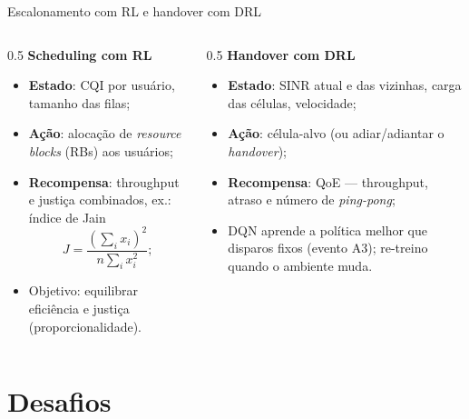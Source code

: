 \documentclass[aspectratio=169,11pt]{beamer}
\begin{document}
\begin{frame}{Escalonamento com RL e handover com DRL}
  \begin{columns}
    \begin{column}{0.5\textwidth}
      \textbf{Scheduling com RL}
      \begin{itemize}
        \item \textbf{Estado}: CQI por usuário, tamanho das filas;
        \item \textbf{Ação}: alocação de \emph{resource blocks} (RBs) aos usuários;
        \item \textbf{Recompensa}: throughput e justiça combinados, ex.: índice de Jain
          $$J = \frac{(\sum_i x_i)^2}{n\sum_i x_i^2};$$
        \item Objetivo: equilibrar eficiência e justiça (proporcionalidade).
      \end{itemize}
    \end{column}
    \begin{column}{0.5\textwidth}
      \textbf{Handover com DRL}
      \begin{itemize}
        \item \textbf{Estado}: SINR atual e das vizinhas, carga das células, velocidade;
        \item \textbf{Ação}: célula-alvo (ou adiar/adiantar o \emph{handover});
        \item \textbf{Recompensa}: QoE --- throughput, atraso e número de \emph{ping-pong};
        \item DQN aprende a política melhor que disparos fixos (evento A3); re-treino quando o ambiente muda.
      \end{itemize}
    \end{column}
  \end{columns}
\end{frame}

\section{Desafios}
\end{document}
